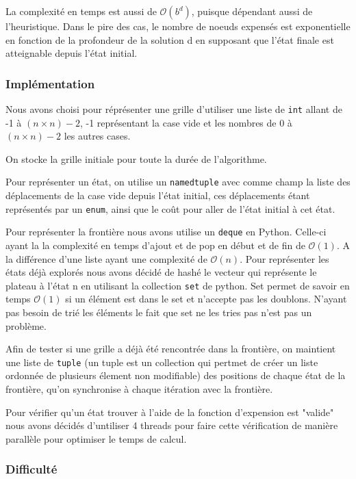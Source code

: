 \documentclass[a4paper, 12pt]{article}
\begin{document}
    La complexité en temps est aussi de $\mathcal{O}(b^{d})$, puisque dépendant aussi de l'heuristique. Dans le pire des cas, le nombre de noeuds expensés est exponentielle en fonction de la profondeur de la solution d en supposant que l'état finale est atteignable depuis l'état initial. 
    
    \subsubsection{Implémentation}

    Nous avons choisi pour réprésenter une grille d'utiliser une liste de \lstinline{int} allant de -1 à $(n \times n) - 2$, -1 représentant la case vide et les nombres de 0 à $(n \times n) - 2$ les autres cases.

    On stocke la grille initiale pour toute la durée de l'algorithme.

    Pour représenter un état, on utilise un \lstinline{namedtuple} avec comme champ la liste des déplacements de la case vide depuis l'état initial, ces déplacements étant représentés par un \lstinline{enum}, ainsi que le coût pour aller de l'état initial à cet état.

    Pour représenter la frontière nous avons utilise un \lstinline{deque} en Python. Celle-ci ayant la la complexité en temps d'ajout et de pop en début et de fin de $\mathcal{O}(1)$. A la différence d'une liste ayant une complexité de $\mathcal{O}(n)$. 
    Pour représenter les états déjà explorés nous avons décidé de hashé le vecteur qui représente le plateau à l'état n en utilisant la collection \lstinline{set} de python. Set permet de savoir en temps $\mathcal{O}(1)$ si un élément est dans le set et n'accepte pas les doublons. N'ayant pas besoin de trié les éléments le fait que set ne les tries pas n'est pas un problème. 


    Afin de tester si une grille a déjà été rencontrée dans la frontière, on maintient une liste de \lstinline{tuple} (un tuple est un collection qui pertmet de créer un liste ordonnée de plusieurs élement non modifiable) des positions de chaque état de la frontière, qu'on synchronise à chaque itération avec la frontière.


    Pour vérifier qu'un état trouver à l'aide de la fonction d'expension est "valide" nous avons décidés d'untiliser 4 threads pour faire cette vérification de manière parallèle pour optimiser le temps de calcul.

    \subsubsection{Difficulté}
\end{document}
